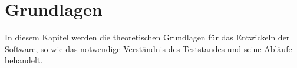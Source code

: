 
\newpage
\section{Grundlagen}
\label{sec:grundlagen}

In diesem Kapitel werden die theoretischen Grundlagen für das Entwickeln der Software,
so wie das notwendige Verständnis des Teststandes und seine Abläufe behandelt.









